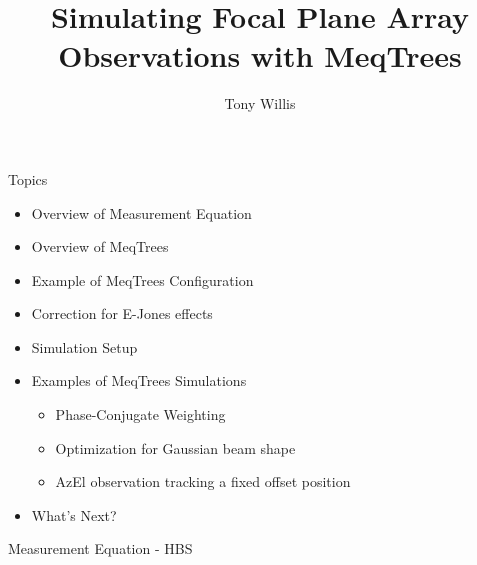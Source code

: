 \documentclass[pdf,azure,slideColor,colorBG]{prosper}
\title{Simulating Focal Plane Array Observations with MeqTrees}
\author{\green Tony Willis}
\begin{document}
\maketitle


\begin{slide}{Topics}
\begin{small}
\begin{itemize}
\item Overview of Measurement Equation
\item Overview of MeqTrees
\item Example of MeqTrees Configuration
\item Correction for E-Jones effects
\item Simulation Setup
\item Examples of MeqTrees Simulations
\begin{itemize}
\item Phase-Conjugate Weighting
\item Optimization for Gaussian beam shape
\item AzEl observation tracking a fixed offset position
\end{itemize}
\item What's Next?
\end{itemize}
\end{small}
\end{slide}

\begin{slide}{Measurement Equation - HBS}
{\centering
{}
\par}
\end{slide}
\end{document}
